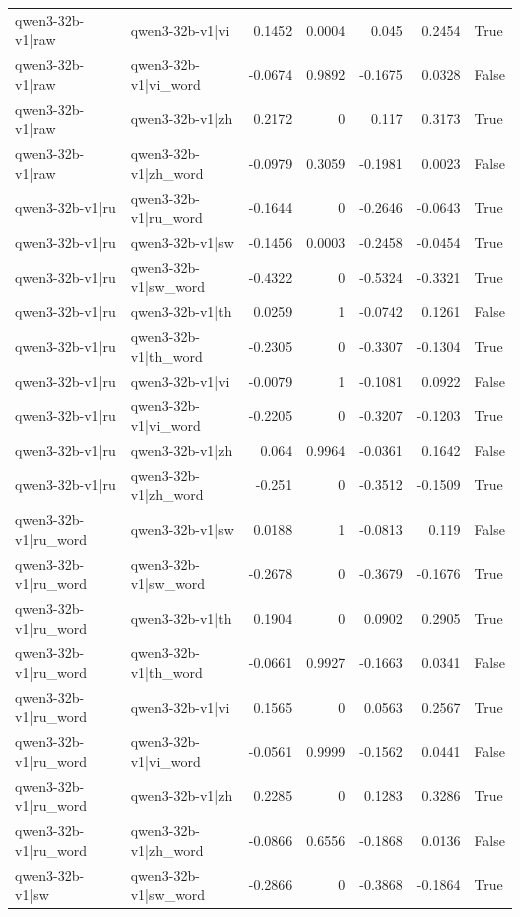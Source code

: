 \begin{table}
\begin{tabular}{l l r r r r l}
qwen3-32b-v1|raw & qwen3-32b-v1|vi & 0.1452 & 0.0004 & 0.045 & 0.2454 & True \\
qwen3-32b-v1|raw & qwen3-32b-v1|vi_word & -0.0674 & 0.9892 & -0.1675 & 0.0328 & False \\
qwen3-32b-v1|raw & qwen3-32b-v1|zh & 0.2172 & 0 & 0.117 & 0.3173 & True \\
qwen3-32b-v1|raw & qwen3-32b-v1|zh_word & -0.0979 & 0.3059 & -0.1981 & 0.0023 & False \\
qwen3-32b-v1|ru & qwen3-32b-v1|ru_word & -0.1644 & 0 & -0.2646 & -0.0643 & True \\
qwen3-32b-v1|ru & qwen3-32b-v1|sw & -0.1456 & 0.0003 & -0.2458 & -0.0454 & True \\
qwen3-32b-v1|ru & qwen3-32b-v1|sw_word & -0.4322 & 0 & -0.5324 & -0.3321 & True \\
qwen3-32b-v1|ru & qwen3-32b-v1|th & 0.0259 & 1 & -0.0742 & 0.1261 & False \\
qwen3-32b-v1|ru & qwen3-32b-v1|th_word & -0.2305 & 0 & -0.3307 & -0.1304 & True \\
qwen3-32b-v1|ru & qwen3-32b-v1|vi & -0.0079 & 1 & -0.1081 & 0.0922 & False \\
qwen3-32b-v1|ru & qwen3-32b-v1|vi_word & -0.2205 & 0 & -0.3207 & -0.1203 & True \\
qwen3-32b-v1|ru & qwen3-32b-v1|zh & 0.064 & 0.9964 & -0.0361 & 0.1642 & False \\
qwen3-32b-v1|ru & qwen3-32b-v1|zh_word & -0.251 & 0 & -0.3512 & -0.1509 & True \\
qwen3-32b-v1|ru_word & qwen3-32b-v1|sw & 0.0188 & 1 & -0.0813 & 0.119 & False \\
qwen3-32b-v1|ru_word & qwen3-32b-v1|sw_word & -0.2678 & 0 & -0.3679 & -0.1676 & True \\
qwen3-32b-v1|ru_word & qwen3-32b-v1|th & 0.1904 & 0 & 0.0902 & 0.2905 & True \\
qwen3-32b-v1|ru_word & qwen3-32b-v1|th_word & -0.0661 & 0.9927 & -0.1663 & 0.0341 & False \\
qwen3-32b-v1|ru_word & qwen3-32b-v1|vi & 0.1565 & 0 & 0.0563 & 0.2567 & True \\
qwen3-32b-v1|ru_word & qwen3-32b-v1|vi_word & -0.0561 & 0.9999 & -0.1562 & 0.0441 & False \\
qwen3-32b-v1|ru_word & qwen3-32b-v1|zh & 0.2285 & 0 & 0.1283 & 0.3286 & True \\
qwen3-32b-v1|ru_word & qwen3-32b-v1|zh_word & -0.0866 & 0.6556 & -0.1868 & 0.0136 & False \\
qwen3-32b-v1|sw & qwen3-32b-v1|sw_word & -0.2866 & 0 & -0.3868 & -0.1864 & True \\

\end{tabular}
\end{table}
